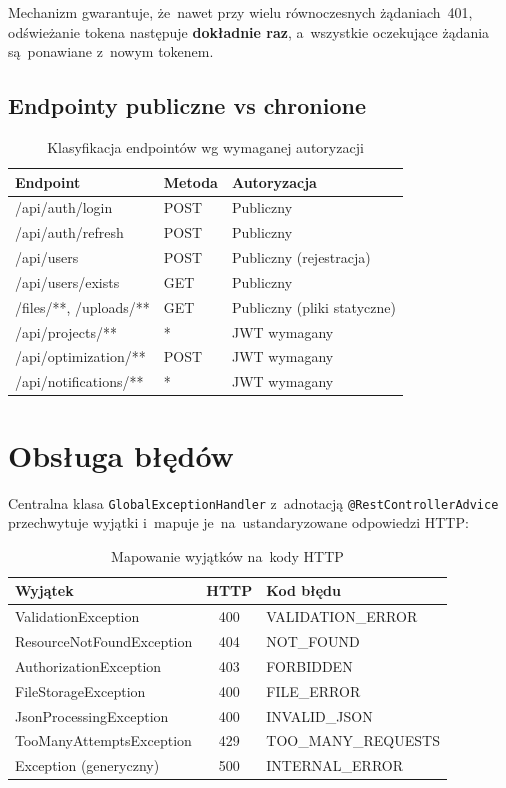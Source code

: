 Mechanizm gwarantuje, że~nawet przy wielu równoczesnych żądaniach~401, odświeżanie tokena następuje \textbf{dokładnie raz}, a~wszystkie oczekujące żądania są~ponawiane z~nowym tokenem.

\subsection{Endpointy publiczne vs chronione}

\begin{table}[H]
\centering
\caption{Klasyfikacja endpointów wg wymaganej autoryzacji}
\begin{tabular}{|l|l|l|}
\hline
\textbf{Endpoint} & \textbf{Metoda} & \textbf{Autoryzacja} \\ \hline
/api/auth/login & POST & Publiczny \\ \hline
/api/auth/refresh & POST & Publiczny \\ \hline
/api/users & POST & Publiczny (rejestracja) \\ \hline
/api/users/exists & GET & Publiczny \\ \hline
/files/**, /uploads/** & GET & Publiczny (pliki statyczne) \\ \hline
/api/projects/** & * & JWT wymagany \\ \hline
/api/optimization/** & POST & JWT wymagany \\ \hline
/api/notifications/** & * & JWT wymagany \\ \hline
\end{tabular}
\end{table}

\section{Obsługa błędów}

Centralna klasa \texttt{GlobalExceptionHandler} z~adnotacją \texttt{@RestControllerAdvice} przechwytuje wyjątki i~mapuje je~na~ustandaryzowane odpowiedzi HTTP:

\begin{table}[H]
\centering
\caption{Mapowanie wyjątków na~kody HTTP}
\label{tab:exception_mapping}
\begin{tabular}{|l|c|l|}
\hline
\textbf{Wyjątek} & \textbf{HTTP} & \textbf{Kod błędu} \\ \hline
ValidationException & 400 & VALIDATION\_ERROR \\ \hline
ResourceNotFoundException & 404 & NOT\_FOUND \\ \hline
AuthorizationException & 403 & FORBIDDEN \\ \hline
FileStorageException & 400 & FILE\_ERROR \\ \hline
JsonProcessingException & 400 & INVALID\_JSON \\ \hline
TooManyAttemptsException & 429 & TOO\_MANY\_REQUESTS \\ \hline
Exception (generyczny) & 500 & INTERNAL\_ERROR \\ \hline
\end{tabular}
\end{table}

